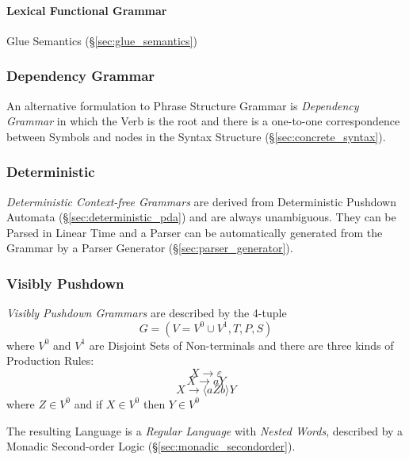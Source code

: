 \paragraph{Lexical Functional Grammar}\label{sec:lexical_functional}

Glue Semantics (\S\ref{sec:glue_semantics})



\subsubsection{Dependency Grammar}\label{sec:dependency_grammar}

An alternative formulation to Phrase Structure Grammar is
\emph{Dependency Grammar} in which the Verb is the root and there is a
one-to-one correspondence between Symbols and nodes in the Syntax
Structure (\S\ref{sec:concrete_syntax}).



\subsubsection{Deterministic}\label{sec:deterministic_cfg}

\emph{Deterministic Context-free Grammars} are derived from
Deterministic Pushdown Automata (\S\ref{sec:deterministic_pda}) and
are always unambiguous. They can be Parsed in Linear Time and a Parser
can be automatically generated from the Grammar by a Parser Generator
(\S\ref{sec:parser_generator}).



\subsubsection{Visibly Pushdown}\label{sec:visibly_pushdown}

\emph{Visibly Pushdown Grammars} are described by the 4-tuple
\[
  G = (V=V^0 \cup V^1,T,P,S)
\]
where $V^0$ and $V^1$ are Disjoint Sets of Non-terminals and there
are three kinds of Production Rules:
\[
  X \rightarrow \varepsilon
\]\[
  X \rightarrow aY
\]\[
  X \rightarrow \langle aZb \rangle Y
\]
where $Z \in V^0$ and if $X \in V^0$ then $Y \in V^0$

The resulting Language is a \emph{Regular Language} with \emph{Nested
  Words}, described by a Monadic Second-order Logic
(\S\ref{sec:monadic_secondorder}).



